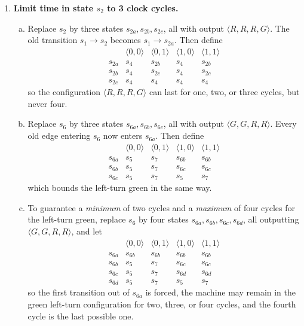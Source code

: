 \begin{enumerate}[{7.}1.]
\item \textbf{Limit time in state $s_2$ to 3 clock cycles.}

\begin{enumerate}[(a)]
  \item Replace $s_2$ by three states $s_{2a},s_{2b},s_{2c}$, all with output
  $\langle R,R,R,G\rangle$.  The old transition $s_1\to s_2$ becomes
  $s_1\to s_{2a}$.  Then define
  \[
  \begin{array}{c|cccc}
  & \langle 0,0\rangle & \langle 0,1\rangle & \langle 1,0\rangle & \langle 1,1\rangle\\
  \hline
  s_{2a} & s_4 & s_{2b} & s_4 & s_{2b}\\
  s_{2b} & s_4 & s_{2c} & s_4 & s_{2c}\\
  s_{2c} & s_4 & s_4 & s_4 & s_4
  \end{array}
  \]
  so the configuration $\langle R,R,R,G\rangle$ can last for one, two, or three
  cycles, but never four.

  \item Replace $s_6$ by three states $s_{6a},s_{6b},s_{6c}$, all with output
  $\langle G,G,R,R\rangle$.  Every old edge entering $s_6$ now enters
  $s_{6a}$.  Then define
  \[
  \begin{array}{c|cccc}
  & \langle 0,0\rangle & \langle 0,1\rangle & \langle 1,0\rangle & \langle 1,1\rangle\\
  \hline
  s_{6a} & s_5 & s_7 & s_{6b} & s_{6b}\\
  s_{6b} & s_5 & s_7 & s_{6c} & s_{6c}\\
  s_{6c} & s_5 & s_7 & s_5 & s_7
  \end{array}
  \]
  which bounds the left-turn green in the same way.

  \item To guarantee a \emph{minimum} of two cycles and a \emph{maximum} of four
  cycles for the left-turn green, replace $s_6$ by four states
  $s_{6a},s_{6b},s_{6c},s_{6d}$, all outputting $\langle G,G,R,R\rangle$, and
  let
  \[
  \begin{array}{c|cccc}
  & \langle 0,0\rangle & \langle 0,1\rangle & \langle 1,0\rangle & \langle 1,1\rangle\\
  \hline
  s_{6a} & s_{6b} & s_{6b} & s_{6b} & s_{6b}\\
  s_{6b} & s_5 & s_7 & s_{6c} & s_{6c}\\
  s_{6c} & s_5 & s_7 & s_{6d} & s_{6d}\\
  s_{6d} & s_5 & s_7 & s_5 & s_7
  \end{array}
  \]
  so the first transition out of $s_{6a}$ is forced, the machine may remain in
  the green left-turn configuration for two, three, or four cycles, and the
  fourth cycle is the last possible one.
\end{enumerate}


\end{enumerate}
